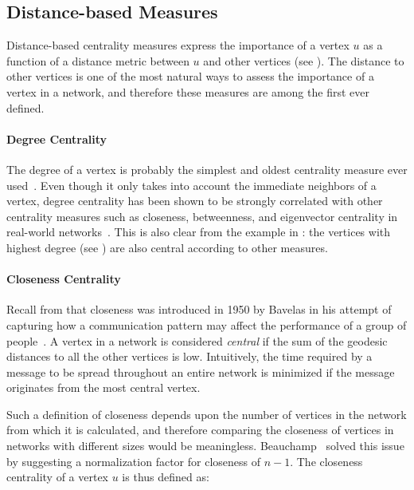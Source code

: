 \subsection{Distance-based Measures}
\label{sec:prelim-dist-based-centrality}
%
Distance-based centrality measures express the importance of a vertex $u$ as a
function of a distance metric between $u$ and other vertices (see
).
The distance to other vertices is one of the most natural ways to assess the
importance of a vertex in a network, and therefore these measures are among
the first ever defined.

\paragraph{Degree Centrality}
%
The degree of a vertex is probably the simplest and oldest centrality
measure ever used~\cite{freeman1978centrality}. Even though it only takes
into account the immediate neighbors of a vertex,
degree centrality has been shown to be strongly correlated with other centrality
measures such as closeness, betweenness, and eigenvector
centrality in real-world networks~\cite{valente2008correlated, lim2011online}.
This is also clear from the example in : the
vertices with highest degree (see ) are also central
according to other measures.


\paragraph{Closeness Centrality}
%
Recall from  that closeness was introduced in 1950 by
Bavelas in his attempt of capturing how a communication pattern may affect the
performance of a group of people~\cite{bavelas1950communication}. A vertex in a
network is considered \emph{central} if the sum of the geodesic distances to
all the other vertices is low. Intuitively, the time required by a message to
be spread throughout an entire network is minimized if the message originates
from the most central vertex.

Such a definition of closeness depends upon the number of vertices
in the network from which it is calculated, and therefore comparing the closeness
of vertices in networks with different sizes would be meaningless.
Beauchamp~\cite{beauchamp1965improved} solved this issue by suggesting
a normalization factor for closeness of $n-1$.
The closeness centrality of a vertex $u$ is thus defined as:

